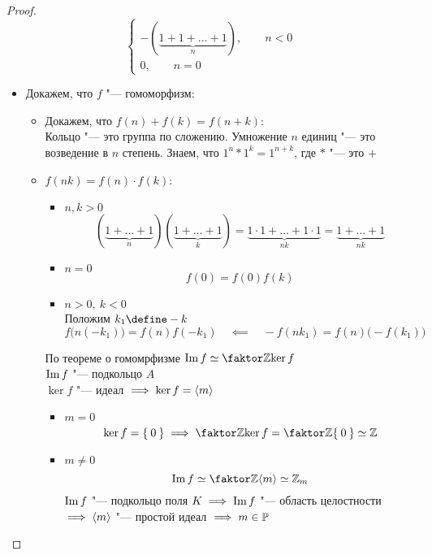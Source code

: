 \begin{theorem}
\begin{enumerate}
\begin{proof}
$$\begin{cases}
				-(\underbrace{1 + 1 + \dots + 1}_n), \qquad n < 0 \\
				0, \qquad n = 0
			\end{cases} $$
			\begin{itemize}
				\item Докажем, что $ f $ "--- гомоморфизм:
				\begin{itemize}
					\item Докажем, что $ f(n) + f(k) = f(n + k) $: \\
					Кольцо "--- это группа по сложению. Умножение $ n $ единиц "--- это возведение в $ n $ степень. Знаем, что $ 1^n * 1^k = 1^{n + k} $, где $ * $ "--- это $ + $
					\item $ f(nk) = f(n) \cdot f(k) $:
					\begin{itemize}
						\item $ n, k > 0 $
						$$ (\underbrace{1 + \dots + 1}_n)(\underbrace{1 + \dots + 1}_k) = \underbrace{1 \cdot 1 + \dots + 1 \cdot 1}_{nk} = \underbrace{1 + \dots + 1}_{nk} $$
						\item $ n = 0 $
						$$ f(0) = f(0) f(k) $$
						\item $ n > 0, ~ k < 0 $ \\
						Положим $ k_1 \define -k $
						$$ f \bigg( n(-k_1) \bigg) = f(n) f(-k_1) \quad \impliedby \quad -f(nk_1) = f(n) \bigg( -f(k_1) \bigg) $$
					\end{itemize}
					По теореме о гомомрфизме $ \Img f \simeq \faktor\Z{\ker f} $ \\
					$ \operatorname{Im} f $ "--- подкольцо $ A $ \\
					$ \ker f $ "--- идеал $ \implies \ker f = \Braket m $
					\begin{itemize}
						\item $ m = 0 $
						$$ \ker f = \set0 \implies \faktor\Z{\ker f} = \faktor\Z{\set0} \simeq \Z $$
						\item $ m \ne 0 $
						$$ \Img f \simeq \faktor\Z{\braket m} \simeq \Z_m $$
						$ \operatorname{Im} f $ "--- подкольцо поля $ K \implies \operatorname{Im} f $ "--- область целостности \\
						$ \implies \Braket m $ "--- простой идеал $ \implies m \in \mathbb{P} $
					\end{itemize}
				\end{itemize}
			\end{itemize}
		\end{proof}
	\end{enumerate}
\end{theorem}

